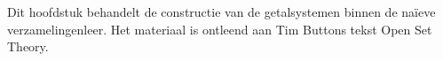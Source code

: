 \documentclass[../../../include/open-logic-section]{subfiles}
\begin{document}
	

\begin{editorial}
Dit hoofdstuk behandelt de constructie van de getalsystemen binnen de
na\"ieve verzamelingenleer. Het materiaal is ontleend aan Tim Buttons
tekst Open Set Theory.
\end{editorial}


\OLEndChapterHook
\end{document}
